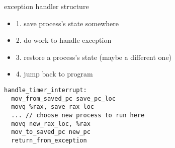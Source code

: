 \begin{frame}[fragile,label=exceptHandlerEx]{exception handler structure}
\begin{itemize}
\item 1. save process's state somewhere
\item 2. do work to handle exception
\item 3. restore a process's state (maybe a different one)
\item 4. jump back to program
\end{itemize}
\begin{lstlisting}
handle_timer_interrupt:
  mov_from_saved_pc save_pc_loc
  movq %rax, save_rax_loc
  ... // choose new process to run here
  movq new_rax_loc, %rax
  mov_to_saved_pc new_pc
  return_from_exception
\end{lstlisting}
\end{frame}


